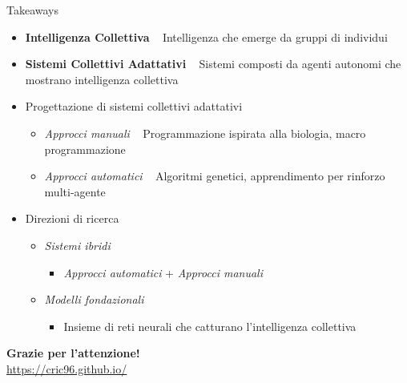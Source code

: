 \documentclass[presentation, 10pt,aspectratio=169]{beamer}\mode<presentation>{\usetheme{AMSBolognaFC}}
\begin{document}
\begin{frame}{Takeaways}
	\begin{itemize}
		\item \textbf{Intelligenza Collettiva} \faArrowRight ~ Intelligenza che emerge da gruppi di individui
		\item \textbf{Sistemi Collettivi Adattativi} \faArrowRight ~ Sistemi composti da agenti autonomi che mostrano intelligenza collettiva
		\item Progettazione di sistemi collettivi adattativi
		\begin{itemize}
			\item \emph{Approcci manuali} \faArrowRight ~ Programmazione ispirata alla biologia, macro programmazione
			\item \emph{Approcci automatici} \faArrowRight ~ Algoritmi genetici, apprendimento per rinforzo multi-agente
		\end{itemize}
		\item Direzioni di ricerca
		\begin{itemize}
			\item \emph{Sistemi ibridi}
			\begin{itemize}
				\item \emph{Approcci automatici} + \emph{Approcci manuali}
			\end{itemize}
			\item \emph{Modelli fondazionali}
			\begin{itemize}
				\item Insieme di reti neurali che catturano l'intelligenza collettiva
			\end{itemize}
		\end{itemize}
	\end{itemize}
\end{frame}

{

	
	\begin{frame}[c]
		
		{
		\color{customfg}
	
		\begin{center}
		\Large\textbf{Grazie per l'attenzione!} \\
	
		\large{\url{https://cric96.github.io/}}
		\end{center}
	
		\vspace{1cm}	
	}
\end{frame}
}




\end{document}
